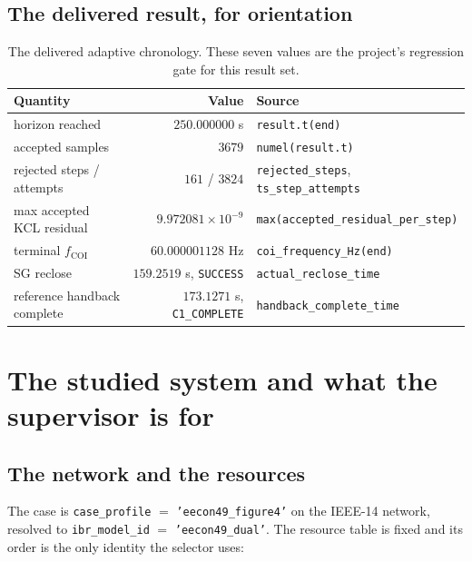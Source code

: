 \documentclass[12pt,a4paper]{article}
\theoremstyle{remark}
\newcommand{\code}[1]{\texttt{\small #1}}
\begin{document}
\subsection{The delivered result, for orientation}

\begin{table}[H]
\centering
\small
\begin{tabularx}{\textwidth}{@{}lrX@{}}
\toprule
\textbf{Quantity} & \textbf{Value} & \textbf{Source}\\
\midrule
horizon reached & $250.000000$ s & \code{result.t(end)}\\
accepted samples & $3679$ & \code{numel(result.t)}\\
rejected steps / attempts & $161$ / $3824$ & \code{rejected\_steps}, \code{ts\_step\_attempts}\\
max accepted KCL residual & $9.972081\times10^{-9}$ & \code{max(accepted\_residual\_per\_step)}\\
terminal $f_{\mathrm{COI}}$ & $60.000001128$ Hz & \code{coi\_frequency\_Hz(end)}\\
SG reclose & $159.2519$ s, \code{SUCCESS} & \code{actual\_reclose\_time}\\
reference handback complete & $173.1271$ s, \code{C1\_COMPLETE} & \code{handback\_complete\_time}\\
\bottomrule
\end{tabularx}
\caption{The delivered adaptive chronology. These seven values are the
project's regression gate for this result set.}
\end{table}

\section{The studied system and what the supervisor is for}

\subsection{The network and the resources}

The case is \code{case\_profile} $=$ \code{'eecon49\_figure4'} on the IEEE-14
network, resolved to \code{ibr\_model\_id} $=$ \code{'eecon49\_dual'}. The
resource table is fixed and its order is the only identity the selector uses:
\end{document}

